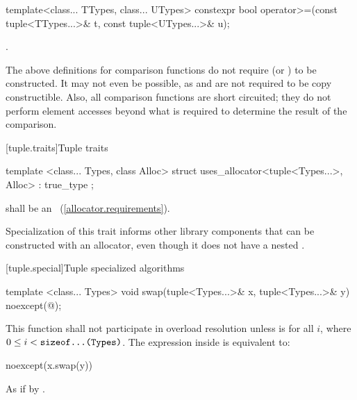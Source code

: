 %
\begin{itemdecl}
template<class... TTypes, class... UTypes>
  constexpr bool operator>=(const tuple<TTypes...>& t, const tuple<UTypes...>& u);
\end{itemdecl}

\begin{itemdescr}
\pnum\returns {}.
\end{itemdescr}

\pnum \begin{note} The above definitions for comparison functions
do not require 
(or ) to be constructed. It may not
even be possible, as  and  are not required to be copy
constructible. Also, all comparison functions are short circuited;
they do not perform element accesses beyond what is required to determine the
result of the comparison. \end{note}

[tuple.traits]{Tuple traits}

%
\begin{itemdecl}
template <class... Types, class Alloc>
  struct uses_allocator<tuple<Types...>, Alloc> : true_type { };
\end{itemdecl}

\begin{itemdescr}
\pnum
\requires {} shall be an ~(\ref{allocator.requirements}).

\pnum
\begin{note} Specialization of this trait informs other library components that
 can be constructed with an allocator, even though it does not have
a nested . \end{note}
\end{itemdescr}

[tuple.special]{Tuple specialized algorithms}

%
\begin{itemdecl}
template <class... Types>
  void swap(tuple<Types...>& x, tuple<Types...>& y) noexcept(@\seebelow@);
\end{itemdecl}

\begin{itemdescr}
\pnum
\remarks This function shall not participate in overload resolution
unless  is 
for all $i$, where $0 \leq i < \texttt{sizeof...(Types)}$.
The expression inside  is equivalent to:

\begin{codeblock}
noexcept(x.swap(y))
\end{codeblock}

\pnum
\effects As if by .
\end{itemdescr}

